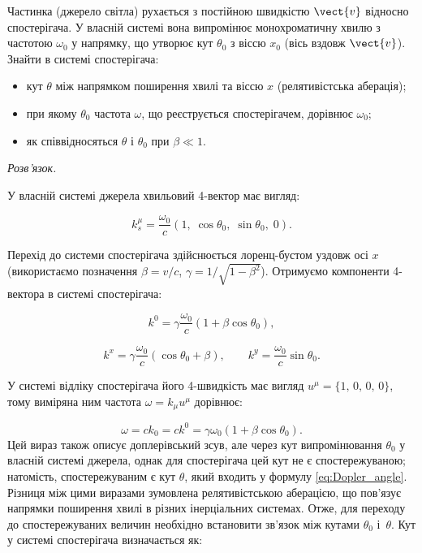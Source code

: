 \begin{problem}
    Частинка (джерело світла) рухається з постійною швидкістю $\vect{v}$
    відносно спостерігача. У власній системі вона випромінює монохроматичну
    хвилю з частотою $\omega_0$ у напрямку, що утворює кут $\theta_0$ з
    віссю $x_0$ (вісь вздовж $\vect{v}$). Знайти в системі спостерігача:
    \begin{itemize}
        \item кут $\theta$ між напрямком поширення хвилі та віссю $x$
              (релятивістська аберація);
        \item при якому $\theta_0$ частота $\omega$, що реєструється
              спостерігачем, дорівнює $\omega_0$;
        \item як співвідносяться $\theta$ і $\theta_0$ при $\beta\ll 1$.
    \end{itemize}

    \textit{Розв'язок.}


    У власній системі джерела хвильовий 4-вектор має вигляд:

    \[
        k_s^\mu = \frac{\omega_0}{c}
        \left(1,\;\cos\theta_0,\;\sin\theta_0,\;0\right).
    \]

    Перехід до системи спостерігача здійснюється лоренц-бустом уздовж осі $x$ (використаємо позначення $\beta = v/c$, $\gamma = 1/\sqrt{1-\beta^2}$). Отримуємо компоненти 4-вектора в системі спостерігача:

    \[
        k^0 = \gamma \frac{\omega_0}{c}\left(1 + \beta\cos\theta_0\right),
    \]

    \[
        k^x = \gamma \frac{\omega_0}{c}\left(\cos\theta_0 + \beta\right),
        \qquad
        k^y = \frac{\omega_0}{c}\sin\theta_0.
    \]

    У системі відліку спостерігача його 4-швидкість має вигляд
    $u^{\mu} = \{1,\,0,\, 0,\, 0\}$, тому виміряна ним частота $\omega = k_{\mu} u^{\mu}$ дорівнює:

    \begin{equation}\label{eq:Doppler_theta0}
        \omega = c k_0 = c k^0
        = \gamma \omega_0 (1 + \beta\cos\theta_0).\tag{*}
    \end{equation}
    Цей вираз також описує доплерівський зсув, але через кут випромінювання $\theta_0$ у власній системі джерела, однак
    для спостерігача цей кут не є спостережуваною; натомість, спостережуваним є кут $\theta$, який входить у формулу
    \eqref{eq:Dopler_angle}. Різниця між цими виразами зумовлена релятивістською аберацією, що пов’язує напрямки
    поширення хвилі в різних інерціальних системах. Отже, для переходу до спостережуваних величин необхідно встановити
    зв'язок між кутами $\theta_0$ і~$\theta$. Кут у системі спостерігача визначається як:


\end{problem}
